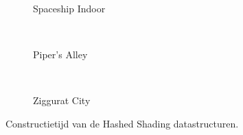 \begin{figure}[t]
\begin{minipage}[t]{0.5\textwidth}
\begin{adjustbox}{minipage=\textwidth, scale=0.55}
    \begin{subfigure}[b]{1.6\textwidth}
      \centering
      \def\svgwidth{\textwidth}
      
      \caption{Spaceship Indoor}
      \vspace{4pt}
      \label{fig:hs-ns-construction-time:indoor}
    \end{subfigure}
  \end{adjustbox} \\
  \begin{adjustbox}{minipage=\textwidth, scale=0.55}
    \begin{subfigure}[b]{1.6\textwidth}
      \centering
      \def\svgwidth{\textwidth}
      
      \caption{Piper's Alley}
      \vspace{4pt}
      \label{fig:hs-ns-construction-time:alley}
    \end{subfigure}
  \end{adjustbox} \\
  \begin{adjustbox}{minipage=\textwidth, scale=0.55}
    \begin{subfigure}[b]{1.6\textwidth}
      \centering
      \def\svgwidth{\textwidth}
      
      \caption{Ziggurat City}
      \label{fig:hs-ns-construction-time:city}
    \end{subfigure}
  \end{adjustbox}
  \caption{\small Constructietijd van de Hashed Shading datastructuren.}
  \label{fig:hs-ns-construction-time}
  \end{minipage} 
\end{figure}

